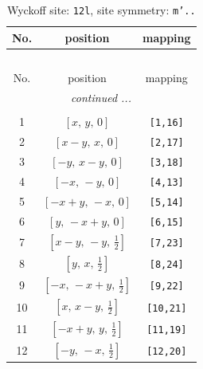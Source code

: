 \documentclass[fleqn,8pt]{jsarticle}
\begin{document}
\begin{longtable}{ccc}
\caption{Wyckoff site: {\tt 12l}, site symmetry: {\tt m'..}}
 \\
 \hline \hline
No. & position & mapping \\ \hline \endfirsthead

\multicolumn{2}{l}{\tablename\ \thetable{}} \\
 \hline \hline
No. & position & mapping \\ \hline \endhead

 \hline \hline
\multicolumn{2}{r}{\footnotesize\it continued ...} \\ \endfoot

 \hline \hline
\multicolumn{2}{r}{} \\ \endlastfoot

1 & $\left[ x,\, y,\, 0 \right]$ & {\tt [1,16]} \\ \hline
2 & $\left[ x - y,\, x,\, 0 \right]$ & {\tt [2,17]} \\ \hline
3 & $\left[ - y,\, x - y,\, 0 \right]$ & {\tt [3,18]} \\ \hline
4 & $\left[ - x,\, - y,\, 0 \right]$ & {\tt [4,13]} \\ \hline
5 & $\left[ - x + y,\, - x,\, 0 \right]$ & {\tt [5,14]} \\ \hline
6 & $\left[ y,\, - x + y,\, 0 \right]$ & {\tt [6,15]} \\ \hline
7 & $\left[ x - y,\, - y,\, \frac{1}{2} \right]$ & {\tt [7,23]} \\ \hline
8 & $\left[ y,\, x,\, \frac{1}{2} \right]$ & {\tt [8,24]} \\ \hline
9 & $\left[ - x,\, - x + y,\, \frac{1}{2} \right]$ & {\tt [9,22]} \\ \hline
10 & $\left[ x,\, x - y,\, \frac{1}{2} \right]$ & {\tt [10,21]} \\ \hline
11 & $\left[ - x + y,\, y,\, \frac{1}{2} \right]$ & {\tt [11,19]} \\ \hline
12 & $\left[ - y,\, - x,\, \frac{1}{2} \right]$ & {\tt [12,20]} \\
\end{longtable}
\renewcommand{\arraystretch}{1.2}
\end{document}
